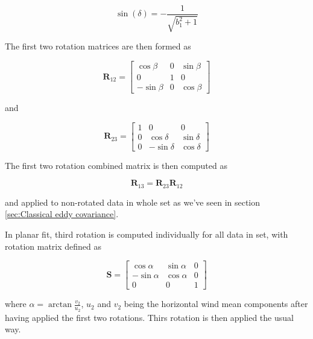 \documentclass[a4paper,10pt]{book}
\begin{document}
\begin{equation}\label{eq:Planar fit angle gamma cosine}
  \sin(\delta) = -\frac{1}{\sqrt{b^{2}_{1} + 1}}
\end{equation} 

The first two rotation matrices are then formed as

\begin{equation}\label{eq:First rotation in PF}
 \mathbf{R}_{12} = \left[
  \begin{array}{ccc}
    \cos \beta & 0 & \sin \beta   \\
        0      & 1 &      0       \\
   -\sin \beta & 0 & \cos \beta
  \end{array}
 \right]
\end{equation}

\noindent and

\begin{equation}\label{eq:Second rotation in PF}
 \mathbf{R}_{23} = \left[
  \begin{array}{ccc}
      1 &       0      &       0      \\
      0 &  \cos \delta &  \sin \delta \\
      0 & -\sin \delta &  \cos \delta
  \end{array}
 \right]
\end{equation}

The first two rotation combined matrix is then computed as

\begin{displaymath}
 \mathbf{R}_{13} = \mathbf{R}_{23} \mathbf{R}_{12}
\end{displaymath}

\noindent and applied to non-rotated data in whole set as we've seen in section \ref{sec:Classical eddy covariance}.

In planar fit, third rotation is computed individually for all data in set, with rotation matrix defined as

\begin{equation}\label{eq:Third rotation in PF}
 \mathbf{S} = \left[
  \begin{array}{ccc}
     \cos \alpha & \sin \alpha & 0 \\
    -\sin \alpha & \cos \alpha & 0 \\
          0      &      0      & 1
  \end{array}
 \right]
\end{equation}

\noindent where $\alpha = \arctan{\frac{v_{2}}{u_{2}}}$, $u_{2}$ and $v_{2}$ being the horizontal wind mean components after having applied the first two rotations. Thirs rotation is then applied the usual way.
\end{document}
